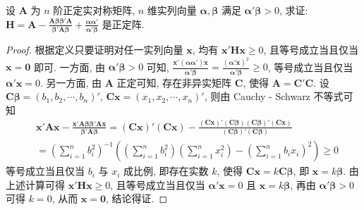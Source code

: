 \documentclass[../../main.tex]{subfiles}%
\begin{document}
\begin{proposition}\label{proposition:A正定则H正定}
设 \(\boldsymbol{A}\) 为 \(n\) 阶正定实对称矩阵, \(n\) 维实列向量 \(\boldsymbol{\alpha},\boldsymbol{\beta}\) 满足 \(\boldsymbol{\alpha}'\boldsymbol{\beta}>0\), 求证: \(\boldsymbol{H}=\boldsymbol{A}-\frac{\boldsymbol{A}\boldsymbol{\beta}\boldsymbol{\beta}'\boldsymbol{A}}{\boldsymbol{\beta}'\boldsymbol{A}\boldsymbol{\beta}}+\frac{\boldsymbol{\alpha}\boldsymbol{\alpha}'}{\boldsymbol{\alpha}'\boldsymbol{\beta}}\) 是正定阵.
\end{proposition}
\begin{proof}

根据定义只要证明对任一实列向量 \(\boldsymbol{x}\), 均有 \(\boldsymbol{x}'\boldsymbol{H}\boldsymbol{x}\geqslant 0\), 且等号成立当且仅当 \(\boldsymbol{x}=\boldsymbol{0}\) 即可. 一方面, 由 \(\boldsymbol{\alpha}'\boldsymbol{\beta}>0\) 可知, \(\frac{\boldsymbol{x}'(\boldsymbol{\alpha}\boldsymbol{\alpha}')\boldsymbol{x}}{\boldsymbol{\alpha}'\boldsymbol{\beta}}=\frac{(\boldsymbol{\alpha}'\boldsymbol{x})^2}{\boldsymbol{\alpha}'\boldsymbol{\beta}}\geqslant 0\), 等号成立当且仅当 \(\boldsymbol{\alpha}'\boldsymbol{x}=0\). 另一方面, 由 \(\boldsymbol{A}\) 正定可知, 存在非异实矩阵 \(\boldsymbol{C}\), 使得 \(\boldsymbol{A}=\boldsymbol{C}'\boldsymbol{C}\). 设 \(\boldsymbol{C}\boldsymbol{\beta}=(b_1,b_2,\cdots,b_n)'\), \(\boldsymbol{C}\boldsymbol{x}=(x_1,x_2,\cdots,x_n)'\), 则由 Cauchy - Schwarz 不等式可知
\begin{align*}
&\boldsymbol{x}'\boldsymbol{A}\boldsymbol{x}-\frac{\boldsymbol{x}'\boldsymbol{A}\boldsymbol{\beta}\boldsymbol{\beta}'\boldsymbol{A}\boldsymbol{x}}{\boldsymbol{\beta}'\boldsymbol{A}\boldsymbol{\beta}}=(\boldsymbol{C}\boldsymbol{x})'(\boldsymbol{C}\boldsymbol{x})-\frac{(\boldsymbol{C}\boldsymbol{x})'(\boldsymbol{C}\boldsymbol{\beta})(\boldsymbol{C}\boldsymbol{\beta})'(\boldsymbol{C}\boldsymbol{x})}{(\boldsymbol{C}\boldsymbol{\beta})'(\boldsymbol{C}\boldsymbol{\beta})}\\
&=\left(\sum_{i = 1}^{n}b_i^2\right)^{-1}\left(\left(\sum_{i = 1}^{n}b_i^2\right)\left(\sum_{i = 1}^{n}x_i^2\right)-\left(\sum_{i = 1}^{n}b_ix_i\right)^2\right)\geqslant 0
\end{align*}
等号成立当且仅当 \(b_i\) 与 \(x_i\) 成比例, 即存在实数 \(k\), 使得 \(\boldsymbol{C}\boldsymbol{x}=k\boldsymbol{C}\boldsymbol{\beta}\), 即 \(\boldsymbol{x}=k\boldsymbol{\beta}\). 由上述计算可得 \(\boldsymbol{x}'\boldsymbol{H}\boldsymbol{x}\geqslant 0\), 且等号成立当且仅当 \(\boldsymbol{\alpha}'\boldsymbol{x}=0\) 且 \(\boldsymbol{x}=k\boldsymbol{\beta}\), 再由 \(\boldsymbol{\alpha}'\boldsymbol{\beta}>0\) 可得 \(k = 0\), 从而 \(\boldsymbol{x}=\boldsymbol{0}\), 结论得证. 

\end{proof}
\end{document}
